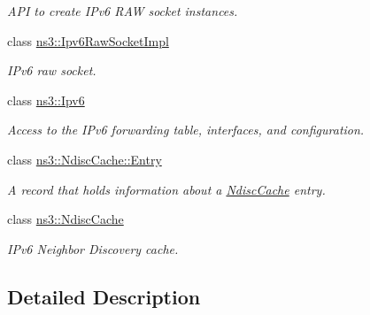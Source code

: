 \begin{DoxyCompactItemize}
\begin{DoxyCompactList}\small\item\em A\+PI to create I\+Pv6 R\+AW socket instances. \end{DoxyCompactList}\item 
class \hyperlink{classns3_1_1Ipv6RawSocketImpl}{ns3\+::\+Ipv6\+Raw\+Socket\+Impl}
\begin{DoxyCompactList}\small\item\em I\+Pv6 raw socket. \end{DoxyCompactList}\item 
class \hyperlink{classns3_1_1Ipv6}{ns3\+::\+Ipv6}
\begin{DoxyCompactList}\small\item\em Access to the I\+Pv6 forwarding table, interfaces, and configuration. \end{DoxyCompactList}\item 
class \hyperlink{classns3_1_1NdiscCache_1_1Entry}{ns3\+::\+Ndisc\+Cache\+::\+Entry}
\begin{DoxyCompactList}\small\item\em A record that holds information about a \hyperlink{classns3_1_1NdiscCache}{Ndisc\+Cache} entry. \end{DoxyCompactList}\item 
class \hyperlink{classns3_1_1NdiscCache}{ns3\+::\+Ndisc\+Cache}
\begin{DoxyCompactList}\small\item\em I\+Pv6 Neighbor Discovery cache. \end{DoxyCompactList}\end{DoxyCompactItemize}


\subsection{Detailed Description}
